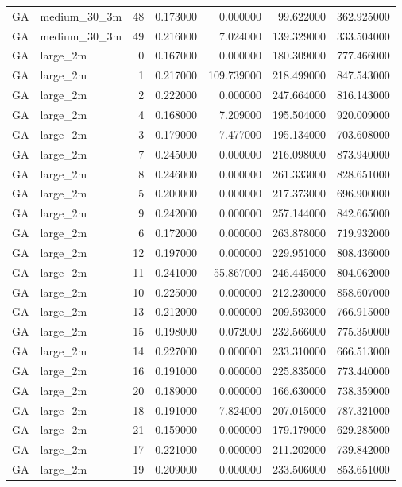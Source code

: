 \begin{tabular}{llrrrrr}
GA & medium_30_3m & 48 & 0.173000 & 0.000000 & 99.622000 & 362.925000 \\
GA & medium_30_3m & 49 & 0.216000 & 7.024000 & 139.329000 & 333.504000 \\
GA & large_2m & 0 & 0.167000 & 0.000000 & 180.309000 & 777.466000 \\
GA & large_2m & 1 & 0.217000 & 109.739000 & 218.499000 & 847.543000 \\
GA & large_2m & 2 & 0.222000 & 0.000000 & 247.664000 & 816.143000 \\
GA & large_2m & 4 & 0.168000 & 7.209000 & 195.504000 & 920.009000 \\
GA & large_2m & 3 & 0.179000 & 7.477000 & 195.134000 & 703.608000 \\
GA & large_2m & 7 & 0.245000 & 0.000000 & 216.098000 & 873.940000 \\
GA & large_2m & 8 & 0.246000 & 0.000000 & 261.333000 & 828.651000 \\
GA & large_2m & 5 & 0.200000 & 0.000000 & 217.373000 & 696.900000 \\
GA & large_2m & 9 & 0.242000 & 0.000000 & 257.144000 & 842.665000 \\
GA & large_2m & 6 & 0.172000 & 0.000000 & 263.878000 & 719.932000 \\
GA & large_2m & 12 & 0.197000 & 0.000000 & 229.951000 & 808.436000 \\
GA & large_2m & 11 & 0.241000 & 55.867000 & 246.445000 & 804.062000 \\
GA & large_2m & 10 & 0.225000 & 0.000000 & 212.230000 & 858.607000 \\
GA & large_2m & 13 & 0.212000 & 0.000000 & 209.593000 & 766.915000 \\
GA & large_2m & 15 & 0.198000 & 0.072000 & 232.566000 & 775.350000 \\
GA & large_2m & 14 & 0.227000 & 0.000000 & 233.310000 & 666.513000 \\
GA & large_2m & 16 & 0.191000 & 0.000000 & 225.835000 & 773.440000 \\
GA & large_2m & 20 & 0.189000 & 0.000000 & 166.630000 & 738.359000 \\
GA & large_2m & 18 & 0.191000 & 7.824000 & 207.015000 & 787.321000 \\
GA & large_2m & 21 & 0.159000 & 0.000000 & 179.179000 & 629.285000 \\
GA & large_2m & 17 & 0.221000 & 0.000000 & 211.202000 & 739.842000 \\
GA & large_2m & 19 & 0.209000 & 0.000000 & 233.506000 & 853.651000 \\

\end{tabular}
